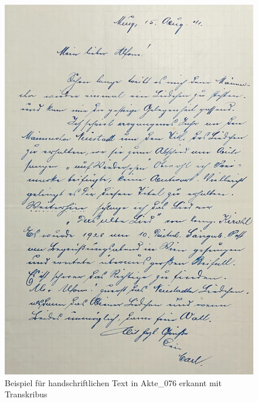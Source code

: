 \documentclass[12pt, a4paper, ngerman, bidi=default]{article}
\begin{document}
\begin{figure}[htbp]
  \centering
  \includegraphics[width=\textwidth]{./assets/Images/Akte_076_S001.jpg}
  \caption{Beispiel für handschriftlichen Text in Akte\_076 erkannt mit Transkribus}\label{}
\end{figure}
\end{document}
